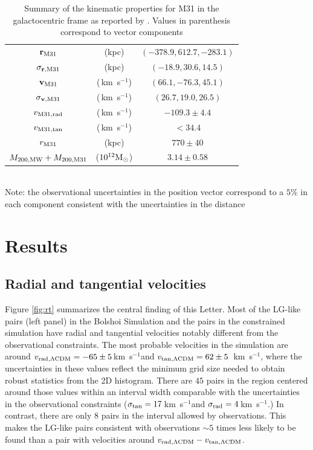 \documentclass{emulateapj}
\newcommand{\kms}{\,km~s$^{-1}$}
\newcommand{\Msun}{{\ifmmode{{\rm {M_{\odot}}}}\else{${\rm{M_{\odot}}}$}\fi}}
\begin{document}
\begin{table}
\caption{Summary of the kinematic properties for M31 in the galactocentric frame as reported by \citep{vanderMarel12}. Values in parenthesis correspond to vector components}
\begin{center}
\begin{tabular}{ccc}\hline\hline
${\bf r}_{\rm M31}$ & (kpc) &$(-378.9, 612.7, -283.1)$\\
$\sigma_{{\bf r}, {\rm M31}}$ & (kpc) &$(-18.9, 30.6, 14.5)$\\
${\bf v}_{\rm M31}$ & (\kms) & $(66.1, -76.3, 45.1)$\\
$\sigma_{{\bf v},{\rm M31}}$ & (\kms) &$(26.7, 19.0, 26.5)$\\
$v_{\rm M31,rad}$ &(\kms) & $-109.3\pm 4.4$\\
$v_{\rm M31,tan}$ &(\kms) & $<34.4$\\
$r_{\rm M31}$ &(kpc) & $770\pm 40$\\
$M_{\rm 200,MW} + M_{\rm 200, M31}$ & ($10^{12}\Msun$) & $3.14\pm 0.58$\\\hline
\end{tabular}\\
\vspace{1mm}
Note: the observational uncertainties in the position vector correspond to a $5\%$ in each component consistent with the uncertainties in the distance \citep[see references in][]{vanderMarel08}
\end{center}
\label{table:1}
\end{table}



\section{Results}
\label{sec:results}




\subsection{Radial and tangential velocities}

Figure \ref{fig:rt} summarizes the central finding of this Letter. Most of the LG-like pairs (left panel) in the Bolshoi Simulation and the pairs in the constrained simulation have radial and tangential velocities notably different from the observational constraints.  The most probable velocities in the simulation are around $v_{\rm rad,\Lambda CDM} = -65\pm5$\kms and $v_{\rm tan,\Lambda CDM} = 62\pm5$ \kms, where the uncertainties in these values reflect the minimum grid size needed to obtain robust statistics from the 2D histogram. There are $45$ pairs in the region centered around those values within an interval width comparable with the uncertainties in the observational constraints ($\sigma_{\rm tan}=17$\kms and $\sigma_{\rm rad}=4$\kms.) In contrast, there are only $8$ pairs in the interval allowed by observations. This makes the LG-like pairs consistent with observations $\sim5$ times less likely to be found than a pair with velocities around $v_{\rm rad,\Lambda CDM}-v_{\rm tan,\Lambda CDM}$.
\end{document}
